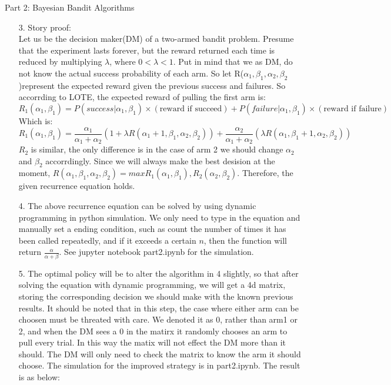 \documentclass{article}
\begin{document}
\begin{homeworkProblem}{Part 2: Bayesian Bandit Algorithms}
\begin{enumerate}
        \item[3.]
        Story proof:\\
        Let us be the decision maker(DM) of a two-armed bandit problem. Presume that the experiment lasts forever, 
        but the reward returned each time is reduced by multiplying $\lambda$, where $0<\lambda<1$. Put in mind that we as DM, 
        do not know the actual success probability of each arm. So let R($\alpha_1,\beta_1,\alpha_2,\beta_2$)represent the expected reward given the previous success and failures.
        So accorrding to LOTE, the expected reward of pulling the first arm is:
        $$R_1(\alpha_1,\beta_1) = P(success|\alpha_1,\beta_1)\times(\text{reward if succeed})+P(failure|\alpha_1,\beta_1)\times(\text{reward if failure})$$
        Which is:
        $$R_1(\alpha_1,\beta_1) = \frac{\alpha_1}{\alpha_1+\alpha_2}(1+\lambda R(\alpha_1+1,\beta_1,\alpha_2,\beta_2))+\frac{\alpha_2}{\alpha_1+\alpha_2}(\lambda R(\alpha_1,\beta_1+1,\alpha_2,\beta_2))$$
        $R_2$ is similar, the only difference is in the case of arm 2 we should change $\alpha_2$ and $\beta_2$ accorrdingly.
        Since we will always make the best desision at the moment, $R(\alpha_1,\beta_1,\alpha_2,\beta_2) = max{R_1(\alpha_1,\beta_1),R_2(\alpha_2,\beta_2)}$.
        Therefore, the given recurrence equation holds.
        \item[4.]
        The above recurrence equation can be solved by using dynamic programming in python simulation. We only need to type in the equation and manually set a ending condition,
        such as count the number of times it has been called repeatedly, and if it exceeds a certain $n$, then the function will return $\frac{\alpha}{\alpha+\beta}$.
        See jupyter notebook part2.ipynb for the simulation.
        \item[5.]
        The optimal policy will be to alter the algorithm in 4 slightly, so that after solving the equation with dynamic programming, we will get a 4d matrix, storing the corresponding decision we should make 
        with the known previous results. It should be noted that in this step, the case where either arm can be choosen must be threated with care. We denoted it as 0, rather than arm1 or 2, 
        and when the DM sees a 0 in the matirx it randomly chooses an arm to pull every trial. In this way the matix will not effect the DM more than it should.
        The DM will only need to check the matrix to know the arm it should choose. The simulation for the improved strategy is in part2.ipynb.
        The result is as below:

\end{enumerate}
\end{homeworkProblem}
\end{document}
